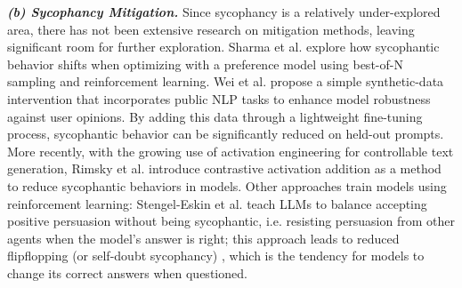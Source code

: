 \textbf{\textit{(b) Sycophancy Mitigation.}}
Since sycophancy is a relatively under-explored area, there has not been extensive research on mitigation methods, leaving significant room for further exploration. Sharma et al. \cite{sharma2023understanding} explore how sycophantic behavior shifts when optimizing with a preference model using best-of-N sampling and reinforcement learning.
Wei et al. \cite{wei2023simple} propose a simple synthetic-data intervention that incorporates public NLP tasks to enhance model robustness against user opinions. By adding this data through a lightweight fine-tuning process, sycophantic behavior can be significantly reduced on held-out prompts.
More recently, with the growing use of activation engineering \cite{turner2023activation} for controllable text generation, Rimsky et al. \cite{panickssery2023steering} introduce contrastive activation addition as a method to reduce sycophantic behaviors in models.
Other approaches train models using reinforcement learning: Stengel-Eskin et al. \cite{stengel-eskin2025teaching}  teach LLMs to balance accepting positive persuasion without being sycophantic, i.e. resisting persuasion from other agents when the model's answer is right; this approach leads to reduced flipflopping (or self-doubt sycophancy) \cite{laban2023you}, which is the tendency for models to change its correct answers when questioned. 


